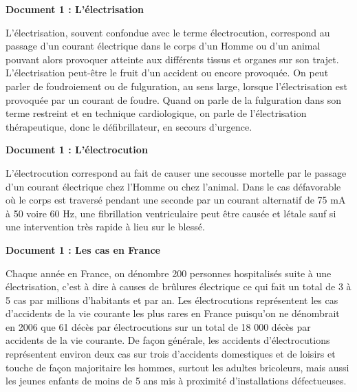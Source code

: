 \documentclass[10pt]{article}
\begin{document}
\textbf{\color{DarkBlue} {Document 1 : L'électrisation }}  

L'électrisation, souvent confondue avec le terme électrocution, correspond au passage d'un courant
électrique dans le corps d'un Homme ou d'un animal pouvant alors provoquer atteinte aux différents
tissus et organes sur son trajet. L'électrisation peut-être le fruit d'un accident ou encore provoquée.
On peut parler de foudroiement ou de fulguration, au sens large, lorsque l'électrisation est
provoquée par un courant de foudre. Quand on parle de la fulguration dans son terme restreint et en
technique cardiologique, on parle de l'électrisation thérapeutique, donc le défibrillateur, en secours
d'urgence.

\vspace{5pt}
\textbf{\color{DarkBlue} {Document 1 : L'électrocution }}  

L'électrocution correspond au fait de causer une secousse mortelle par le passage d'un courant
électrique chez l'Homme ou chez l'animal. Dans le cas défavorable où le corps est traversé pendant
une seconde par un courant alternatif de 75 mA à 50 voire 60 Hz, une fibrillation ventriculaire peut
être causée et létale sauf si une intervention très rapide à lieu sur le blessé.

\vspace{5pt}
\textbf{\color{DarkBlue} {Document 1 : Les cas en France }}  
 
Chaque année en France, on dénombre 200 personnes hospitalisés suite à une électrisation, c'est à
dire à causes de brûlures électrique ce qui fait un total de 3 à 5 cas par millions d'habitants et par
an.
Les électrocutions représentent les cas d'accidents de la vie courante les plus rares en France
puisqu'on ne dénombrait en 2006 que 61 décès par électrocutions sur un total de 18 000 décès par
accidents de la vie courante.
De façon générale, les accidents d'électrocutions représentent environ deux cas sur trois d'accidents
domestiques et de loisirs et touche de façon majoritaire les hommes, surtout les adultes bricoleurs,
mais aussi les jeunes enfants de moins de 5 ans mis à proximité d'installations défectueuses.
\end{document}
